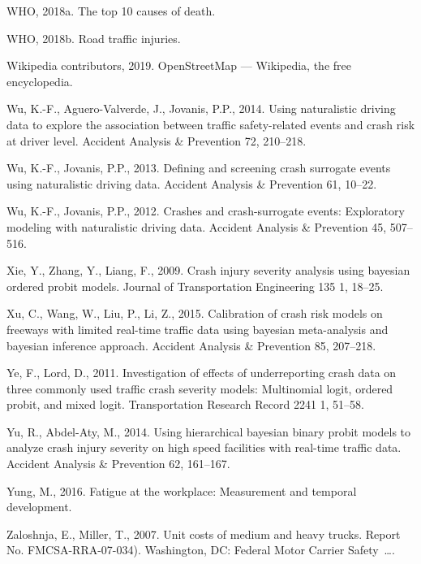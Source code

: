 \documentclass[12pt]{book}
\numberwithin{equation}{chapter}
\begin{document}
\leavevmode\hypertarget{ref-who2018}{}%
WHO, 2018a. The top 10 causes of death.

\leavevmode\hypertarget{ref-who2018b}{}%
WHO, 2018b. Road traffic injuries.

\leavevmode\hypertarget{ref-wikiOSM}{}%
Wikipedia contributors, 2019. OpenStreetMap --- Wikipedia, the free encyclopedia.

\leavevmode\hypertarget{ref-wu2014using}{}%
Wu, K.-F., Aguero-Valverde, J., Jovanis, P.P., 2014. Using naturalistic driving data to explore the association between traffic safety-related events and crash risk at driver level. Accident Analysis \& Prevention 72, 210--218.

\leavevmode\hypertarget{ref-wu2013defining}{}%
Wu, K.-F., Jovanis, P.P., 2013. Defining and screening crash surrogate events using naturalistic driving data. Accident Analysis \& Prevention 61, 10--22.

\leavevmode\hypertarget{ref-wu2012crashes}{}%
Wu, K.-F., Jovanis, P.P., 2012. Crashes and crash-surrogate events: Exploratory modeling with naturalistic driving data. Accident Analysis \& Prevention 45, 507--516.

\leavevmode\hypertarget{ref-xie2009crash}{}%
Xie, Y., Zhang, Y., Liang, F., 2009. Crash injury severity analysis using bayesian ordered probit models. Journal of Transportation Engineering 135 1, 18--25.

\leavevmode\hypertarget{ref-xu2015calibration}{}%
Xu, C., Wang, W., Liu, P., Li, Z., 2015. Calibration of crash risk models on freeways with limited real-time traffic data using bayesian meta-analysis and bayesian inference approach. Accident Analysis \& Prevention 85, 207--218.

\leavevmode\hypertarget{ref-ye2011investigation}{}%
Ye, F., Lord, D., 2011. Investigation of effects of underreporting crash data on three commonly used traffic crash severity models: Multinomial logit, ordered probit, and mixed logit. Transportation Research Record 2241 1, 51--58.

\leavevmode\hypertarget{ref-yu2014using}{}%
Yu, R., Abdel-Aty, M., 2014. Using hierarchical bayesian binary probit models to analyze crash injury severity on high speed facilities with real-time traffic data. Accident Analysis \& Prevention 62, 161--167.

\leavevmode\hypertarget{ref-yung2016fatigue}{}%
Yung, M., 2016. Fatigue at the workplace: Measurement and temporal development.

\leavevmode\hypertarget{ref-zaloshnja2007unit}{}%
Zaloshnja, E., Miller, T., 2007. Unit costs of medium and heavy trucks. Report No. FMCSA-RRA-07-034). Washington, DC: Federal Motor Carrier Safety~\ldots{}.
\end{document}
